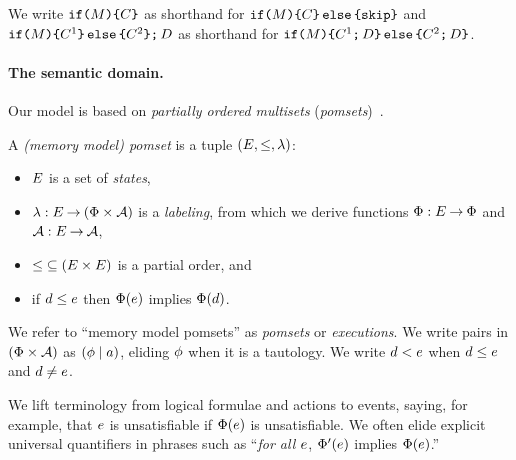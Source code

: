 We write
$\texttt{if}\allowbreak\texttt{(}M\texttt{)} \allowbreak\texttt{\{} C \texttt{\}}$ as shorthand for
$\texttt{if}\allowbreak\texttt{(}M\texttt{)} \allowbreak\texttt{\{} C\texttt{\}}\,\allowbreak\texttt{else}\allowbreak\,\texttt{\{} \texttt{skip}\texttt{\}}$ and
$\texttt{if}\allowbreak\texttt{(}M\texttt{)} \allowbreak\texttt{\{} C^1 \texttt{\}}\,\allowbreak\texttt{else}\allowbreak\,\texttt{\{} C^2 \texttt{\}} \texttt{;}\,\allowbreak D$ as shorthand for
$\texttt{if}\allowbreak\texttt{(}M\texttt{)} \allowbreak\texttt{\{} C^1 \texttt{;}\,\allowbreak D\texttt{\}}\,\allowbreak\texttt{else}\allowbreak\,\texttt{\{} C^2 \texttt{;}\,\allowbreak D\texttt{\}}$.

\paragraph{The semantic domain.}
Our model is based on \emph{partially ordered multisets} (\emph{pomsets})~\cite{GISCHER1988199}.
\begin{definition}
  \label{def:mmpomset}
  A \emph{(memory model) pomset} is a tuple
  $(\Event, {\le}, %
  \labeling)$: %
  \begin{itemize}
  \item $E$ is a set of \emph{states},
  \item $\lambda: E \mathbin\rightarrow (\Phi\times\mathcal{A})$ is a \emph{labeling},
    from which we derive functions $\Phi:E\mathbin\rightarrow\Phi$ and $\mathcal{A}:E\mathbin\rightarrow\mathcal{A}$,
  \item ${\le} \subseteq (E\times E)$ is a partial order, and
  \item if $d\le e$ then $\Phi(e)$ implies
    $\Phi(d)$.
  \end{itemize}
\end{definition}
We refer to ``memory model pomsets'' as \emph{pomsets} or \emph{executions}.
We write pairs in $(\Phi\times\mathcal{A})$ as $(\phi \mid a)$, eliding
$\phi$ when it is a tautology.
We write $d<e$ when $d\le e$ and $d\neq e$.

We lift terminology from logical formulae and actions to events, saying, for example,
that $e$ is unsatisfiable if $\Phi(e)$ is unsatisfiable. %
We often elide explicit universal quantifiers in phrases such as
``\emph{for all $e$}, $\Phi'(e)$ implies $\Phi(e)$.''

